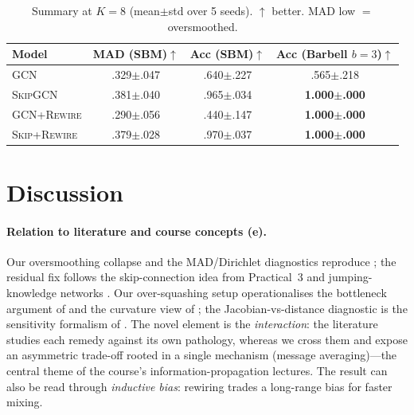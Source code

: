 \documentclass[10pt,a4paper]{article}
\begin{document}
\begin{table}[t]
\centering
\small
\caption{Summary at $K{=}8$ (mean$\pm$std over 5 seeds). $\uparrow$ better. MAD low
$=$ oversmoothed.}
\label{tab:summary}
\begin{tabular}{lccc}
\toprule
Model & MAD (SBM)$\uparrow$ & Acc (SBM)$\uparrow$ & Acc (Barbell $b{=}3$)$\uparrow$ \\
\midrule
\textsc{GCN}          & .329$\pm$.047 & .640$\pm$.227 & .565$\pm$.218 \\
\textsc{SkipGCN}      & .381$\pm$.040 & .965$\pm$.034 & \textbf{1.000$\pm$.000} \\
\textsc{GCN+Rewire}   & .290$\pm$.056 & .440$\pm$.147 & \textbf{1.000$\pm$.000} \\
\textsc{Skip+Rewire}  & .379$\pm$.028 & .970$\pm$.037 & \textbf{1.000$\pm$.000} \\
\bottomrule
\end{tabular}
\end{table}

\section{Discussion}
\label{sec:discussion}

\paragraph{Relation to literature and course concepts (e).}
Our oversmoothing collapse and the MAD/Dirichlet diagnostics reproduce
\cite{li2018deeper,oono2020,rusch2023survey}; the residual fix follows the
skip-connection idea from Practical~3 and jumping-knowledge networks
\cite{xu2018jk,he2016}. Our over-squashing setup operationalises the bottleneck
argument of \cite{alon2021} and the curvature view of \cite{topping2022}; the
Jacobian-vs-distance diagnostic is the sensitivity formalism of
\cite{digiovanni2023}. The novel element is the \emph{interaction}: the literature
studies each remedy against its own pathology, whereas we cross them and expose an
asymmetric trade-off rooted in a single mechanism (message averaging)---the central
theme of the course's information-propagation lectures. The result can also be read
through \emph{inductive bias}: rewiring trades a long-range bias for faster mixing.
\end{document}
